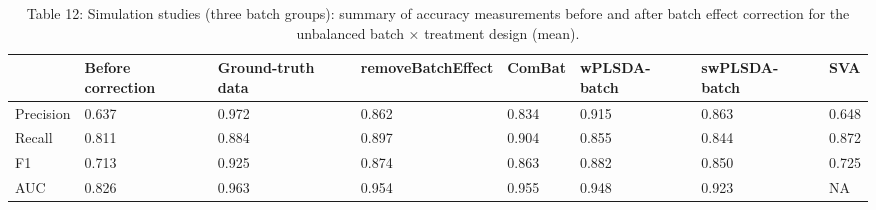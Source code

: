 \documentclass[
]{book}
\begin{document}
\begin{table}

\caption{\label{tab:unnamed-chunk-135}Table 12: Simulation studies (three batch groups): summary of accuracy measurements before and after batch effect correction for the unbalanced batch × treatment design (mean).}
\centering
\begin{tabular}[t]{l|l|l|l|l|l|l|l}
\hline
  & Before correction & Ground-truth data & removeBatchEffect & ComBat & wPLSDA-batch & swPLSDA-batch & SVA\\
\hline
Precision & 0.637 & 0.972 & 0.862 & 0.834 & 0.915 & 0.863 & 0.648\\
\hline
Recall & 0.811 & 0.884 & 0.897 & 0.904 & 0.855 & 0.844 & 0.872\\
\hline
F1 & 0.713 & 0.925 & 0.874 & 0.863 & 0.882 & 0.850 & 0.725\\
\hline
AUC & 0.826 & 0.963 & 0.954 & 0.955 & 0.948 & 0.923 & NA\\
\hline
\end{tabular}
\end{table}
\end{document}
